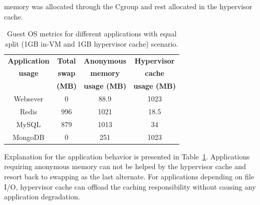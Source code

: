 memory was allocated through the Cgroup and rest allocated in the hypervisor cache.
%
\begin{table}[t]
\begin{center}
\begin{tabular}{|c|c|c|c|}
\hline
{\bf Application} & {\bf Total} & {\bf Anonymous} & {\bf Hypervisor} \\
{\bf usage } & {\bf swap} & {\bf memory} & {\bf cache} \\
 & {\bf (MB)} & {\bf usage (MB)} & {\bf usage (MB)} \\
\hline 
\hline 
Websever & 0 & 88.9 & 1023 \\
Redis & 996 &  1021 & 18.5 \\
MySQL & 879 & 1013 & 34 \\
MongoDB & 0 & 251 & 1023 \\
\hline 
\end{tabular}
\caption{Guest OS metrics for different applications with equal split (1GB in-VM and 1GB 
         hypervisor cache) scenario.}
\label{table:app_diagnosis}
\vspace{-1cm}
\end{center}
\end{table}

Explanation for the application behavior is presented in 
Table~\ref{table:app_diagnosis}.
%
Applications requiring anonymous memory can not be helped by the 
hypervisor cache and resort back to swapping as the last alternate.
%
For applications depending on file I/O, hypervisor cache 
can offload the caching responsibility without causing any
application degradation.
%
 
